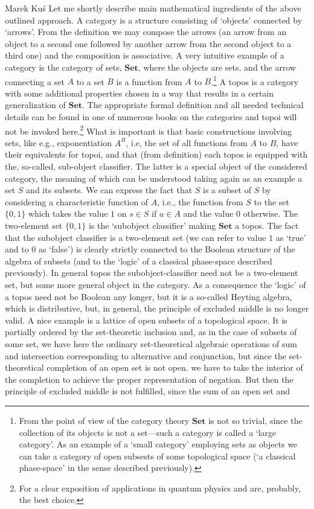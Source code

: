 \begin{artengenv}{Marek Ku\'s}
Let me shortly describe main mathematical ingredients of the above outlined approach. A category is a structure consisting of `objects' connected by `arrows'. From the definition we may compose the arrows (an arrow from an object to a second one followed by another arrow from the second object to a third one) and the composition is associative. A very intuitive example of a category is the category of sets, $\mathbf{Set}$, where the objects are sets, and the arrow connecting a set $A$ to a set $B$ is a function from $A$ to $B$.\footnote{From the point of view of the category theory $\mathbf{Set}$ is not so trivial, since the collection of its objects is not a set---such a category is called a `large category'. As an example of a `small category' employing sets as objects we can take a category of open subsests of some topological space (`a classical phase-space' in the sense described previously). } A topos is a category with some additional properties chosen in a way that results in a certain generalization of $\mathbf{Set}$. The appropriate formal definition and all needed technical details can be found in one of numerous books on the categories and topoi \parencite[e.g.][]{goldblatt_topoi_2014} will not be invoked here.\footnote{For a clear exposition of applications in quantum physics \parencite{flori_first_2013} and \parencite{flori_second_2018} are, probably, the best choice.} What is important is that basic constructions involving sets, like e.g., exponentiation $A^B$, i.e, the set of all functions from $A$ to $B$, have their equivalents for topoi, and that (from definition) each topos is equipped with the, so-called, sub-object classifier. The latter is a special object of the considered category, the meaning of which can  be understood taking again as an example a set $S$ and its subsets. We can express the fact that $S$ is a subset of $S$ by considering a characteristic function of $A$, i.e., the function from $S$ to the set $\{0,1\}$ which takes the value $1$ on $s\in S$ if $a\in A$ and the value $0$ otherwise. The two-element set $\{0,1\}$ is the `subobject classifier' making $\mathbf{Set}$ a topos. The fact that the subobject classifier is a two-element set (we can refer to value $1$ as `true' and to $0$ as `false') is clearly strictly connected to the Boolean structure of the algebra of subsets (and to the `logic' of a classical phase-space described previously). In general topos the subobject-classifier need not be a two-element set, but some more general object in the category. As a consequence the `logic' of a topos need not be Boolean any longer, but it is a so-called Heyting algebra, which is distributive, but, in general, the principle of excluded middle is no longer valid. A nice example is a lattice of open subsets of a topological space. It is partially ordered by the set-theoretic inclusion and, as in the case of subsets of some set, we have here the ordinary set-theoretical algebraic operations of sum and intersection corresponding to alternative and conjunction, but since the set-theoretical completion of an open set is not open. we have to take the interior of  the completion to achieve the proper representation of negation. But then the principle of excluded middle is not fulfilled, since the sum of an open set and 
\end{artengenv}
